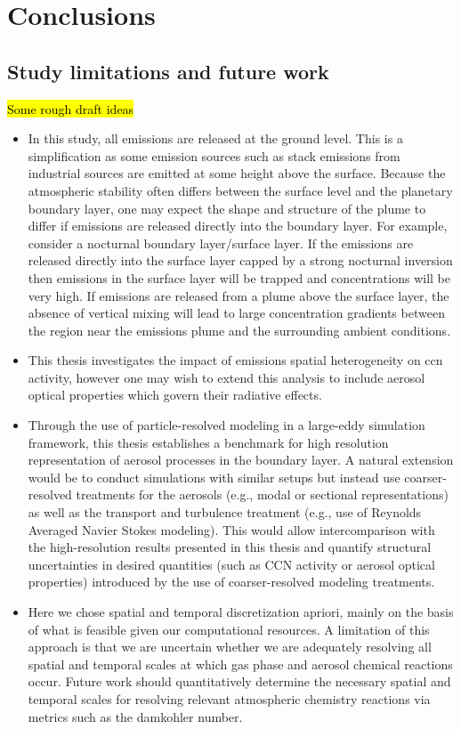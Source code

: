 \chapter{Conclusions}

\section{Study limitations and future work}
\hl{Some rough draft ideas}
\begin{itemize}
\item In this study, all emissions are released at the ground level. This is a simplification as some emission sources such as stack emissions from industrial sources are emitted at some height above the surface. Because the atmospheric stability often differs between the surface level and the planetary boundary layer, one may expect the shape and structure of the plume to differ if emissions are released directly into the boundary layer. For example, consider a nocturnal boundary layer/surface layer. If the emissions are released directly into the surface layer capped by a strong nocturnal inversion then emissions in the surface layer will be trapped and concentrations will be very high. If emissions are released from a plume above the surface layer, the absence of vertical mixing will lead to large concentration gradients between the region near the emissions plume and the surrounding ambient conditions. 

\item This thesis investigates the impact of emissions spatial heterogeneity on ccn activity, however one may wish to extend this analysis to include aerosol optical properties which govern their radiative effects.

\item Through the use of particle-resolved modeling in a large-eddy simulation framework, this thesis establishes a benchmark for high resolution representation of aerosol processes in the boundary layer. A natural extension would be to conduct simulations with similar setups but instead use coarser-resolved treatments for the aerosols (e.g., modal or sectional representations) as well as the transport and turbulence treatment (e.g., use of Reynolds Averaged Navier Stokes modeling). This would allow intercomparison with the high-resolution results presented in this thesis and quantify structural uncertainties in desired quantities (such as CCN activity or aerosol optical properties) introduced by the use of coarser-resolved modeling treatments.
 
\item Here we chose spatial and temporal discretization apriori, mainly on the basis of what is feasible given our computational resources. A limitation of this approach is that we are uncertain whether we are adequately resolving all spatial and temporal scales at which gas phase and aerosol chemical reactions occur. Future work should quantitatively determine the necessary spatial and temporal scales for resolving relevant atmospheric chemistry reactions via metrics such as the damkohler number.


\end{itemize}